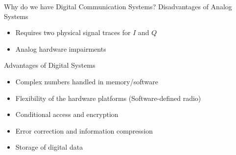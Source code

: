 \begin{frame}{Why do we have Digital Communication Systems?}
  Disadvantages of Analog Systems
  \begin{itemize}
    \item Requires two physical signal traces for $I$ and $Q$
    \item Analog hardware impairments
  \end{itemize}
  Advantages of Digital Systems
  \begin{itemize}
    \item Complex numbers handled in memory/software
    \item Flexibility of the hardware platforms (Software-defined radio)
    \item Conditional access and encryption
    \item Error correction and information compression
    \item Storage of digital data
  \end{itemize}
\end{frame}

